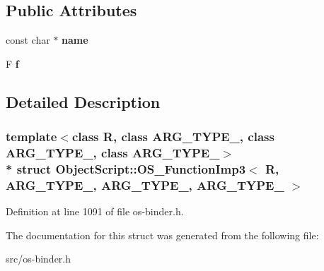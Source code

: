 \subsection*{Public Attributes}
\begin{DoxyCompactItemize}
\item 
const char $\ast$ {\bfseries name}\hypertarget{struct_object_script_1_1_o_s___function_imp3_a2a52a087542060bb56bb7bdcf0838647}{}\label{struct_object_script_1_1_o_s___function_imp3_a2a52a087542060bb56bb7bdcf0838647}

\item 
F {\bfseries f}\hypertarget{struct_object_script_1_1_o_s___function_imp3_aa59eea65bd84d1e3040ee5f8a0ced8a7}{}\label{struct_object_script_1_1_o_s___function_imp3_aa59eea65bd84d1e3040ee5f8a0ced8a7}

\end{DoxyCompactItemize}


\subsection{Detailed Description}
\subsubsection*{template$<$class R, class A\+R\+G\+\_\+\+T\+Y\+P\+E\+\_, class A\+R\+G\+\_\+\+T\+Y\+P\+E\+\_, class A\+R\+G\+\_\+\+T\+Y\+P\+E\+\_$>$\\*
struct Object\+Script\+::\+O\+S\+\_\+\+Function\+Imp3$<$ R, A\+R\+G\+\_\+\+T\+Y\+P\+E\+\_, A\+R\+G\+\_\+\+T\+Y\+P\+E\+\_, A\+R\+G\+\_\+\+T\+Y\+P\+E\+\_ $>$}



Definition at line 1091 of file os-\/binder.\+h.



The documentation for this struct was generated from the following file\+:\begin{DoxyCompactItemize}
\item 
src/os-\/binder.\+h\end{DoxyCompactItemize}
